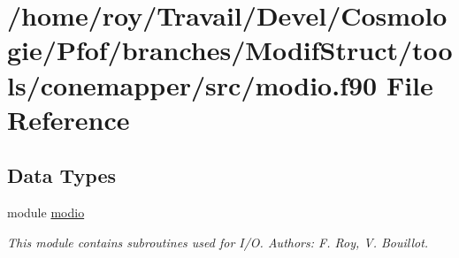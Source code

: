 \hypertarget{tools_2conemapper_2src_2modio_8f90}{\section{/home/roy/\-Travail/\-Devel/\-Cosmologie/\-Pfof/branches/\-Modif\-Struct/tools/conemapper/src/modio.f90 File Reference}
\label{tools_2conemapper_2src_2modio_8f90}
}
\subsection*{Data Types}
\begin{DoxyCompactItemize}
\item 
module \hyperlink{classmodio}{modio}
\begin{DoxyCompactList}\small\item\em This module contains subroutines used for I/\-O. Authors\-: F. Roy, V. Bouillot. \end{DoxyCompactList}\end{DoxyCompactItemize}

